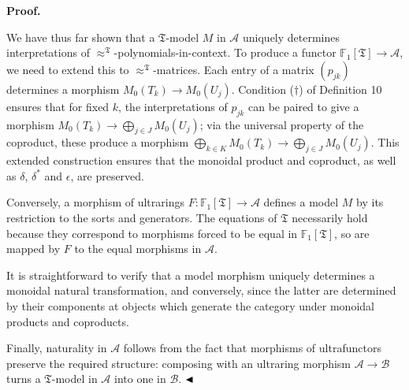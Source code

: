  
 
 
\par\medskip\noindent\textbf{Proof.}\par
 
 
We have thus far shown that a $\mathfrak{T}$-model $M$ in $\mathcal{A}$ uniquely determines interpretations of $\approx^{\mathfrak{T}}$-polynomials-in-context. To produce a functor $\mathbb{F}_{1}[\mathfrak{T}]\to\mathcal{A}$, we need to extend this to $\approx^{\mathfrak{T}}$-matrices. Each entry of a matrix $(p_{jk})$ determines a morphism $M_{0}(T_{k})\to M_{0}(U_{j})$. Condition (${\dagger}$) of Definition 10 ensures that for fixed $k$, the interpretations of $p_{jk}$ can be paired to give a morphism $M_{0}(T_{k})\to\bigoplus_{j\in J}M_{0}(U_{j})$; via the universal property of the coproduct, these produce a morphism $\bigoplus_{k\in K}M_{0}(T_{k})\to\bigoplus_{j\in J}M_{0}(U_{j})$. This extended construction ensures that the monoidal product and coproduct, as well as $\delta$, $\delta^{*}$ and $\epsilon$, are preserved.\par
 
 
 
Conversely, a morphism of ultrarings $F:\mathbb{F}_{1}[\mathfrak{T}]\to\mathcal{A}$ defines a model $M$ by its restriction to the sorts and generators. The equations of $\mathfrak{T}$ necessarily hold because they correspond to morphisms forced to be equal in $\mathbb{F}_{1}[\mathfrak{T}]$, so are mapped by $F$ to the equal morphisms in $\mathcal{A}$.\par
 
 
 
It is straightforward to verify that a model morphism uniquely determines a monoidal natural transformation, and conversely, since the latter are determined by their components at objects which generate the category under monoidal products and coproducts.\par
 
 
 
Finally, naturality in $\mathcal{A}$ follows from the fact that morphisms of ultrafunctors preserve the required structure: composing with an ultraring morphism $\mathcal{A}\to\mathcal{B}$ turns a $\mathfrak{T}$-model in $\mathcal{A}$ into one in $\mathcal{B}$. $\hfill\blacktriangleleft$\par
 
